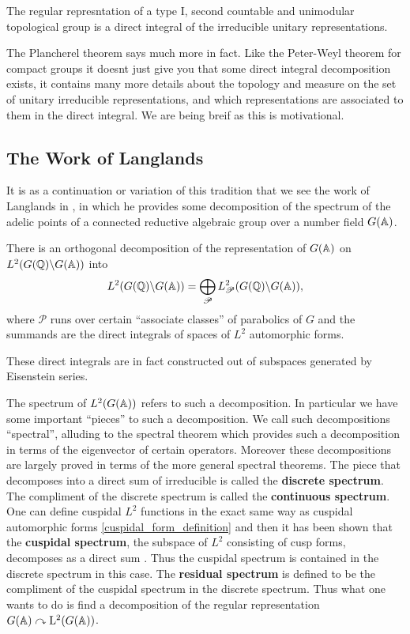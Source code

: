 \begin{Theorem}
	The regular represntation of a type I, second countable and unimodular topological group is a direct integral of the irreducible unitary representations. 
\end{Theorem}
\begin{remark}
	The Plancherel theorem says much more in fact. Like the Peter-Weyl theorem for compact groups it doesnt just give you that some direct integral decomposition exists, it contains many more details about the topology and measure on the set of unitary irreducible representations, and which representations are associated to them in the direct integral. We are being breif as this is motivational.
\end{remark}



\subsection{The Work of Langlands}
It is as a continuation or variation of this tradition that we see the work of Langlands in \cite{langlandsFunctionalEquationsSatisfied1976}, in which he provides some decomposition of the spectrum of the adelic points of a connected reductive algebraic group over a number field \(G(\A)\).

\begin{Theorem}
	There is an orthogonal decomposition of the representation of \(G(\A)\) on \(L^2(G(\Q) \backslash G(\A))\) into 
	\[L^2(G(\Q) \backslash G(\A)) = \bigoplus_{\mathscr{P}}L^2_\mathscr{P}(G(\Q) \backslash G(\A)),\]
	where \(\mathscr{P}\) runs over certain ``associate classes'' of parabolics of \(G\) and the summands are the direct integrals of spaces of \(L^2\) automorphic forms.
\end{Theorem}
These direct integrals are in fact constructed out of subspaces generated by Eisenstein series. 

The spectrum of \(L^2(G(\A))\) refers to such a decomposition. In particular we have some important ``pieces'' to such a decomposition. We call such decompositions ``spectral'', alluding to the spectral theorem which provides such a decomposition in terms of the eigenvector of certain operators. Moreover these decompositions are largely proved in terms of the more general spectral theorems. The piece that decomposes into a direct sum of irreducible is called the \textbf{discrete spectrum}. The compliment of the discrete spectrum is called the \textbf{continuous spectrum}. One can define cuspidal \(L^2\) functions in the exact same way as cuspidal automorphic forms \ref{cuspidal_form_definition} and then it has been shown that the \textbf{cuspidal spectrum}, the subspace of \(L^2\) consisting of cusp forms, decomposes as a direct sum \cite[9]{getzIntroductionAutomorphicRepresentations2024}. Thus the cuspidal spectrum is contained in the discrete spectrum in this case. The \textbf{residual spectrum} is defined to be the compliment of the cuspidal spectrum in the discrete spectrum. Thus what one wants to do is find a decomposition of the regular representation \(G(\A) \curvearrowright \mathrm{L}^2(G(\A))\).

